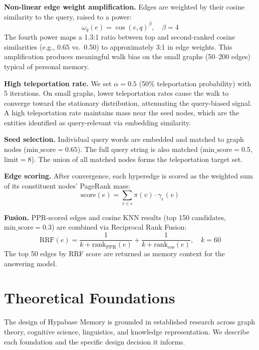 \documentclass[11pt,a4paper]{article}
\begin{document}
\textbf{Non-linear edge weight amplification.} Edges are weighted by their cosine similarity to the query, raised to a power:
\begin{equation}
  \omega_q(e) = \cos(e, q)^\beta, \quad \beta = 4
\end{equation}
The fourth power maps a 1.3:1 ratio between top and second-ranked cosine similarities (e.g., 0.65 vs.\ 0.50) to approximately 3:1 in edge weights. This amplification produces meaningful walk bias on the small graphs (50--200 edges) typical of personal memory.

\textbf{High teleportation rate.} We set $\alpha = 0.5$ (50\% teleportation probability) with 5 iterations. On small graphs, lower teleportation rates cause the walk to converge toward the stationary distribution, attenuating the query-biased signal. A high teleportation rate maintains mass near the seed nodes, which are the entities identified as query-relevant via embedding similarity.

\textbf{Seed selection.} Individual query words are embedded and matched to graph nodes ($\text{min\_score} = 0.65$). The full query string is also matched ($\text{min\_score} = 0.5$, $\text{limit} = 8$). The union of all matched nodes forms the teleportation target set.

\textbf{Edge scoring.} After convergence, each hyperedge is scored as the weighted sum of its constituent nodes' PageRank mass:
\begin{equation}
  \text{score}(e) = \sum_{v \in e} \pi(v) \cdot \gamma_e(v)
\end{equation}

\textbf{Fusion.} PPR-scored edges and cosine KNN results (top 150 candidates, $\text{min\_score} = 0.3$) are combined via Reciprocal Rank Fusion:
\begin{equation}
  \text{RRF}(e) = \frac{1}{k + \text{rank}_{\text{PPR}}(e)} + \frac{1}{k + \text{rank}_{\cos}(e)}, \quad k = 60
\end{equation}
The top 50 edges by RRF score are returned as memory context for the answering model.

\section{Theoretical Foundations}

The design of Hypabase Memory is grounded in established research across graph theory, cognitive science, linguistics, and knowledge representation. We describe each foundation and the specific design decision it informs.
\end{document}
